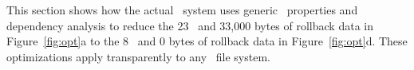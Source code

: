 This section shows how the actual \Kudos\ system uses generic \patch\
properties and dependency analysis to reduce the 23 \patches\ and 33,000 bytes
of rollback data in Figure~\ref{fig:opt}a to the 8 \patches\ and 0 bytes of
rollback data in Figure~\ref{fig:opt}d.
%
These optimizations apply transparently to any \Kudos\ file system.


\begin{comment}

Challenges in a \patch-based file system implementation include:

\textbf{Buffer cache graph traversal.}
%
In order to evict and write a block, the buffer cache must choose a block
$b$,
%
and then find a set of \patches\ $P_b \subseteq \PMem[b]$ whose dependencies
satisfy a graph property, namely that $\PDepset{P_b} \subseteq P_b \cup
\PDisk$.
%
It usually makes sense to define $P_b$ maximally---that is, as the
\emph{largest} corresponding set of \patches.
%
In the ideal (and common) case $P_b = \PMem[b]$, which lets the cache reuse
$b$'s memory once $P_b$ is committed to disk.  However, in some cases there
may be no block for which $P_b = \PMem[b]$.
%
It would also be nice if the blocks chosen for writing also maximized the
disk's commit rate, by minimizing seeks and so forth.

A naive implementation might calculate, for each in-memory block $b$, the
largest set of \patches\ $P_b \subseteq \PMem[b]$ with $\PDepset{P_b}
\subseteq P_b \cup \PDisk$, then evict some block close to previously
written blocks and with few rolled-back \patches\ (where $\PMem[b] - P_b$
is small).
%
This, however, would be extraordinarily expensive.
%
Finding $P_b$ requires traversing a dependency graph which might contain
thousands and thousands of nodes.
%
Doing so for each block, once per eviction, would take huge amounts of CPU
time.


\textbf{Rollback memory usage.}
%
Only a small fraction of \patches\ will ever need to be rolled back.
%
For example, most data writes never need to be rolled back in any file
system.
%
If a \patch\ won't be rolled back under any circumstances, the memory and
CPU time spent to preserve the old version is wasted.


\textbf{\Patch\ memory usage.}
%
\Patches\ themselves take up memory and require time to allocate, free, and
traverse.
%
If two \patches\ have redundant dependencies, it would be faster to combine
them.




The next section tackles all of these challenges.
\end{comment}


